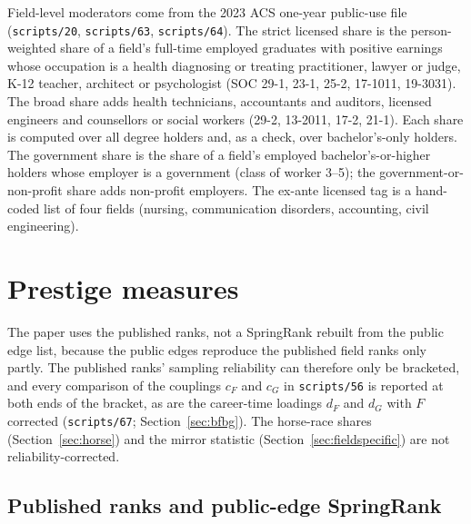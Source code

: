 \documentclass[11pt]{article}
\newcommand{\scr}[1]{\texttt{scripts/#1}}
\begin{document}
Field-level moderators come from the 2023 ACS one-year public-use file (\scr{20}, \scr{63}, \scr{64}). The strict
licensed share is the person-weighted share of a field's full-time employed graduates with positive earnings
whose occupation is a health diagnosing or treating practitioner, lawyer or judge, K-12 teacher, architect or
psychologist (SOC 29-1, 23-1, 25-2, 17-1011, 19-3031). The broad share adds health technicians, accountants
and auditors, licensed engineers and counsellors or social workers (29-2, 13-2011, 17-2, 21-1). Each share is
computed over all degree holders and, as a check, over bachelor's-only holders. The government share is the
share of a field's employed bachelor's-or-higher holders whose employer is a government (class of worker 3--5);
the government-or-non-profit share adds non-profit employers. The ex-ante licensed tag is a hand-coded list of
four fields (nursing, communication disorders, accounting, civil engineering).

\clearpage
\section{Prestige measures}\label{sec:prestige}

The paper uses the published ranks, not a SpringRank rebuilt from the public edge list, because the
public edges reproduce the published field ranks only partly. The published ranks' sampling reliability can
therefore only be bracketed, and every comparison of the couplings $c_F$ and $c_G$ in \scr{56} is reported at
both ends of the bracket, as are the career-time loadings $d_F$ and $d_G$ with $F$ corrected
(\scr{67}; Section~\ref{sec:bfbg}). The horse-race shares (Section~\ref{sec:horse}) and the mirror statistic
(Section~\ref{sec:fieldspecific}) are not reliability-corrected.

\subsection{Published ranks and public-edge SpringRank}\label{sec:springrank}
\end{document}
